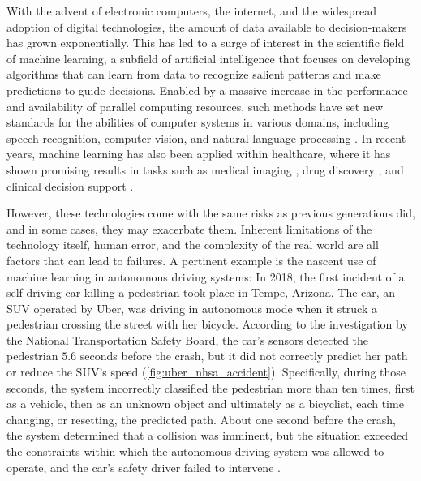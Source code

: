 With the advent of electronic computers, the internet, and the widespread adoption of digital technologies, the amount of data available to decision-makers has grown exponentially. 
This has led to a surge of interest in the scientific field of machine learning, a subfield of artificial intelligence that focuses on developing algorithms that can learn from data to recognize salient patterns and make predictions to guide decisions. 
Enabled by a massive increase in the performance and availability of parallel computing resources, such methods have set new standards for the abilities of computer systems in various domains, including speech recognition, computer vision, and natural language processing \cite{lecun_deep_2015}. 
In recent years, machine learning has also been applied within healthcare, where it has shown promising results in tasks such as medical imaging \cite{lundervold_overview_2019}, drug discovery \cite{chen_rise_2018}, and clinical decision support \cite{cite15, cite14}. 

However, these technologies come with the same risks as previous generations did, and in some cases, they may exacerbate them. 
Inherent limitations of the technology itself, human error, and the complexity of the real world are all factors that can lead to failures. A pertinent example is the nascent use of machine learning in autonomous driving systems: 
In 2018, the first incident of a self-driving car killing a pedestrian took place in Tempe, Arizona. 
The car, an SUV operated by Uber, was driving in autonomous mode when it struck a pedestrian crossing the street with her bicycle. 
According to the investigation by the National Transportation Safety Board, the car's sensors detected the pedestrian $5.6$ seconds before the crash, but it did not correctly predict her path or reduce the SUV's speed (\cref{fig:uber_nhsa_accident}). 
Specifically, during those seconds, the system incorrectly classified the pedestrian more than ten times, first as a vehicle, then as an unknown object and ultimately as a bicyclist, each time changing, or resetting, the predicted path. 
About one second before the crash, the system determined that a collision was imminent, but the situation exceeded the constraints within which the autonomous driving system was allowed to operate, and the car's safety driver failed to intervene \cite{nationaltransportationsafetyboardnhsa_collision_2019}. 


